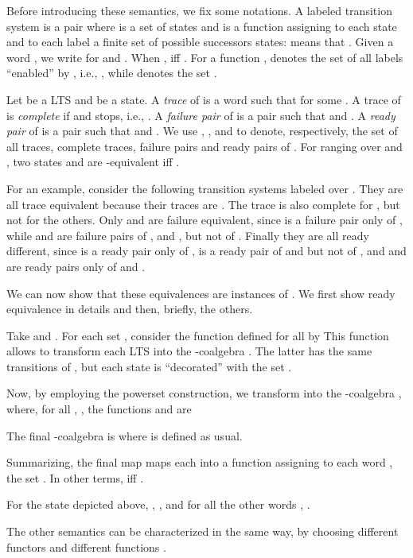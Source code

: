 \documentclass{LMCS}
\begin{document}
\bigskip

Before introducing these semantics, we fix some notations. A
labeled transition system is a pair  where  is a set
of states and  is a function assigning to
each state  and to each label  a finite set of possible
successors states:  means that . Given a
word , we write  for 
and . When ,  iff
.
For a function ,  denotes the set
of all labels ``enabled'' by , i.e., , while  denotes the set
.




Let  be a LTS and  be a state. A \emph{trace}
of  is a word  such that  for some . A
trace  of  is \emph{complete} if  and  stops,
i.e., . A \emph{failure pair} of  is a
pair  such that  and . A \emph{ready pair} of  is a pair  such
that  and . We use ,
,  and  to denote,
respectively, the set of all traces, complete traces, failure pairs
and ready pairs of . For  ranging over  and , two states  and 
are -equivalent iff .

\bigskip

For an example, consider the following transition systems
labeled over . They are all trace equivalent because
their traces are . The trace  is also complete for ,
but not for the others. Only  and  are failure equivalent,
since  is a failure pair only of , while 
and  are failure pairs of ,  and , but not of
. Finally they are all ready different, since  is
a ready pair only of ,  is a ready pair of  and
 but not of , and  and  are ready pairs
only of  and .


We can now show that these equivalences are instances of
. We first show ready equivalence in details and
then, briefly, the others.

Take  and . For each set ,
consider the function 
defined for all  by
 This function allows to
transform each LTS  into the -coalgebra
. The latter has the same
transitions of , but each state  is ``decorated''
with the set
.

Now, by employing the powerset construction, we transform
 into the -coalgebra
, where, for all , , the
functions  and 
are


The final -coalgebra is 
where  is defined as usual.

Summarizing, the final map
 maps each  into a
function assigning to each word , the set . In other terms,
 iff .

For the state  depicted above,
, ,  and for all
the other words , .

\bigskip


The other semantics can be characterized in the same way, by
choosing different functors  and different functions
.
\end{document}
